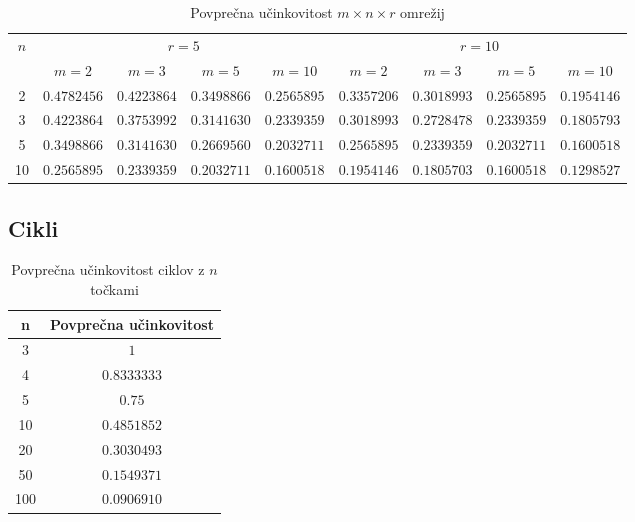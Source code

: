 \documentclass[a4paper, 16pt]{article}
\begin{document}
    \begin{table}[!h]
        \begin{adjustwidth}{-.7in}{-.5in}  
        \begin{center}
        \begin{tabular}{c|c|c|c|c||c|c|c|c}
            \multirow{2}{*}{$n$} & 
            \multicolumn{4}{c}{$r = 5$} & \multicolumn{4}{c}{$r = 10$}\\
               & $m=2$       & $m=3$       & $m=5$       & $m=10$      & $m = 2$     & $m = 3$     & $m=5$       & $m=10$ \\ \hline
            2  & $0.4782456$ & $0.4223864$ & $0.3498866$ & $0.2565895$ & $0.3357206$ & $0.3018993$ & $0.2565895$ & $0.1954146$\\
            3  & $0.4223864$ & $0.3753992$ & $0.3141630$ & $0.2339359$ & $0.3018993$ & $0.2728478$ & $0.2339359$ & $0.1805793$\\
            5  & $0.3498866$ & $0.3141630$ & $0.2669560$ & $0.2032711$ & $0.2565895$ & $0.2339359$ & $0.2032711$ & $0.1600518$\\
            10 & $0.2565895$ & $0.2339359$ & $0.2032711$ & $0.1600518$ & $0.1954146$ & $0.1805703$ & $0.1600518$ & $0.1298527$\\

        \end{tabular}
        \caption{Povprečna učinkovitost $m \times n \times r$ omrežij}
        \label{table: 3}
        \end{center}
        \end{adjustwidth}
    \end{table}


\newpage

    \subsection{Cikli}
    \begin{table}[!h]
        \centering
        \begin{tabular}{c|c}
            n & Povprečna učinkovitost \\ \hline
            3   & $1$ \\
            4   & $0.8333333$ \\
            5   & $0.75$ \\
            10  & $0.4851852$ \\
            20  & $0.3030493$ \\
            50  & $0.1549371$ \\
            100 & $0.0906910$ \\

        \end{tabular}
        \caption{Povprečna učinkovitost ciklov z $n$ točkami}
        \label{table: 4}
    \end{table}
\end{document}
